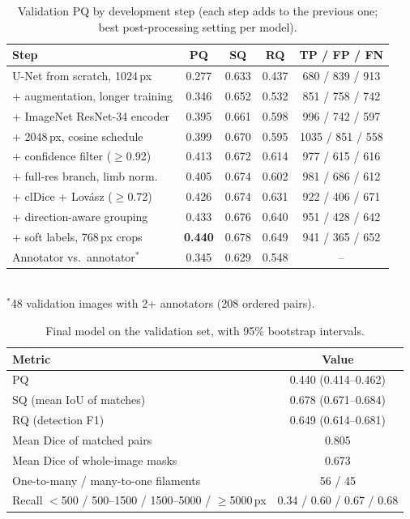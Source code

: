 \documentclass[sigconf]{acmart}
\begin{document}
\begin{table}[t]
\caption{Validation PQ by development step (each step adds to the previous one; best post-processing setting per model).}
\label{tab:ablation}
\small
\begin{tabular}{lcccc}
\toprule
Step & PQ & SQ & RQ & TP / FP / FN \\
\midrule
U-Net from scratch, 1024\,px & 0.277 & 0.633 & 0.437 & 680 / 839 / 913 \\
+ augmentation, longer training & 0.346 & 0.652 & 0.532 & 851 / 758 / 742 \\
+ ImageNet ResNet-34 encoder & 0.395 & 0.661 & 0.598 & 996 / 742 / 597 \\
+ 2048\,px, cosine schedule & 0.399 & 0.670 & 0.595 & 1035 / 851 / 558 \\
+ confidence filter ($\geq$0.92) & 0.413 & 0.672 & 0.614 & 977 / 615 / 616 \\
+ full-res branch, limb norm. & 0.405 & 0.674 & 0.602 & 981 / 686 / 612 \\
+ clDice + Lovász ($\geq$0.72) & 0.426 & 0.674 & 0.631 & 922 / 406 / 671 \\
+ direction-aware grouping & 0.433 & 0.676 & 0.640 & 951 / 428 / 642 \\
+ soft labels, 768\,px crops & \textbf{0.440} & 0.678 & 0.649 & 941 / 365 / 652 \\
\midrule
Annotator vs.\ annotator$^{*}$ & 0.345 & 0.629 & 0.548 & -- \\
\bottomrule
\end{tabular}\\[2pt]
\footnotesize{$^{*}$48 validation images with 2+ annotators (208 ordered pairs).}
\end{table}

\begin{table}[t]
\caption{Final model on the validation set, with 95\% bootstrap intervals.}
\label{tab:final}
\small
\begin{tabular}{lc}
\toprule
Metric & Value \\
\midrule
PQ & 0.440 (0.414--0.462) \\
SQ (mean IoU of matches) & 0.678 (0.671--0.684) \\
RQ (detection F1) & 0.649 (0.614--0.681) \\
Mean Dice of matched pairs & 0.805 \\
Mean Dice of whole-image masks & 0.673 \\
One-to-many / many-to-one filaments & 56 / 45 \\
Recall $<$500 / 500--1500 / 1500--5000 / $\geq$5000\,px & 0.34 / 0.60 / 0.67 / 0.68 \\
\bottomrule
\end{tabular}
\end{table}
\end{document}

